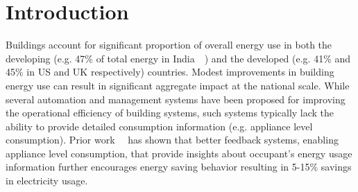 \documentclass[conference]{IEEEtran}
\newcommand{\indic}{INDiC~}
\newcommand{\indicns}{INDiC}
\begin{document}
\begin{abstract}
Residential buildings contribute significantly to the overall energy consumption across most parts of the world. While smart monitoring and control of appliances can reduce the overall energy consumption, management and cost associated with such systems act as a big hindrance. %
Prior work has established that detailed feedback in the form of appliance level consumption to building occupants improves their awareness and paves the way for reduction in electricity consumption. Non-Intrusive Load Monitoring (NILM), i.e. the process of disaggregating the overall home electricity usage measured at the meter level into constituent appliances, provides a simple and cost effective methodology to provide such feedback to the occupants. In this paper we present \textbf{I}mproved \textbf{N}on-Intrusive load monitoring using load \textbf{Di}vision and \textbf{C}alibration (\indicns) that simplifies NILM by dividing the appliances across multiple instrumented points (meters/phases) and calibrating the measured power. Proposed approach is used together with the Combinatorial Optimization framework and evaluated on the popular REDD dataset. Empirical evaluation, using \indic based Combinatorial Optimization, demonstrate significant improvement in disaggregation accuracy.
\end{abstract}
\IEEEpeerreviewmaketitle


\vspace{-3mm}
\section{Introduction}
\vspace{-1mm}
\noindent Buildings account for significant proportion of overall energy use in both the developing (e.g. 47\% of total energy in India~~\cite{evans09}) and the developed (e.g. 41\% and 45\% in US and UK respectively) countries. Modest improvements in building energy use can result in significant aggregate impact at the national scale. While several automation and management systems have been proposed for improving the operational efficiency of building systems, such systems typically lack the ability to provide detailed consumption information (e.g. appliance level consumption). Prior work~~\cite{darby} has shown that better feedback systems, enabling appliance level consumption, that provide insights about occupant's energy usage information further encourages energy saving behavior resulting in 5-15\% savings in electricity usage.
\end{document}

